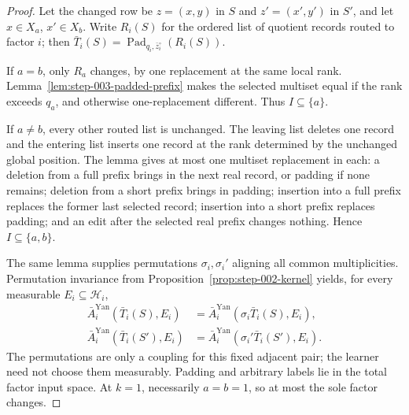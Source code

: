 \begin{proof}
Let the changed row be \(z=(x,y)\) in \(S\) and \(z'=(x',y')\) in \(S'\),
and let \(x\in X_a\), \(x'\in X_b\).  Write \(R_i(S)\) for the ordered
list of quotient records routed to factor \(i\); then
\(\bar T_i(S)=\operatorname{Pad}_{q_i,\bar z_i^\circ}(R_i(S))\).

If \(a=b\), only \(R_a\) changes, by one replacement at the same local
rank.  Lemma~\ref{lem:step-003-padded-prefix} makes the selected multiset
equal if the rank exceeds \(q_a\), and otherwise one-replacement different.
Thus \(I\subseteq\{a\}\).

If \(a\ne b\), every other routed list is unchanged.  The leaving list
deletes one record and the entering list inserts one record at the rank
determined by the unchanged global position.  The lemma gives at most one
multiset replacement in each: a deletion from a full prefix brings in the
next real record, or padding if none remains; deletion from a short prefix
brings in padding; insertion into a full prefix replaces the former last
selected record; insertion into a short prefix replaces padding; and an
edit after the selected real prefix changes nothing.  Hence
\(I\subseteq\{a,b\}\).

The same lemma supplies permutations \(\sigma_i,\sigma_i'\) aligning all
common multiplicities.  Permutation invariance from
Proposition~\ref{prop:step-002-kernel} yields, for every measurable
\(E_i\subseteq\mathcal H_i\),
\begin{equation}\label{eq:step-003-factor-permutation}
\begin{split}
\bar A_i^{\mathrm{Yan}}(\bar T_i(S),E_i)
&=\bar A_i^{\mathrm{Yan}}(\sigma_i\bar T_i(S),E_i),\\
\bar A_i^{\mathrm{Yan}}(\bar T_i(S'),E_i)
&=\bar A_i^{\mathrm{Yan}}(\sigma_i'\bar T_i(S'),E_i).
\end{split}
\end{equation}
The permutations are only a coupling for this fixed adjacent pair; the
learner need not choose them measurably.  Padding and arbitrary labels lie
in the total factor input space.  At \(k=1\), necessarily \(a=b=1\), so at
most the sole factor changes.
\end{proof}

